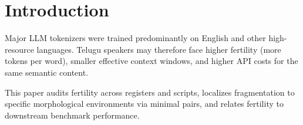 \section{Introduction}

Major LLM tokenizers were trained predominantly on English and other
high-resource languages. Telugu speakers may therefore face higher fertility
(more tokens per word), smaller effective context windows, and higher API
costs for the same semantic content.

This paper audits fertility across registers and scripts, localizes
fragmentation to specific morphological environments via minimal pairs, and
relates fertility to downstream benchmark performance.
